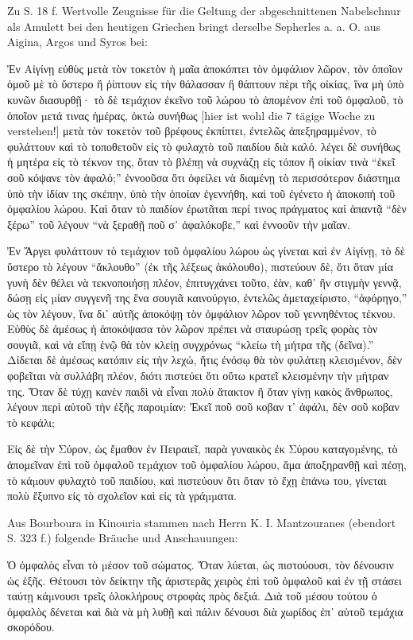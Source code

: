 \documentclass[a4paper, 11pt, oneside]{article}
\begin{document}
Zu S. 18 f. Wertvolle Zeugnisse für die Geltung der abgeschnittenen Nabelschnur als Amulett bei den heutigen Griechen bringt derselbe Sepherles a. a. O. aus Aigina, Argos und Syros bei:

Ἐν Αἰγίνῃ εὐθὺς μετὰ τὸν τοκετὸν ἡ μαῖα ἁποκόπτει τὸν ὀμφάλιον λῶρον, τὸν ὁποῖον ὁμοῦ μὲ τὸ ὕστερο ἢ ῥίπτουν εἰς τὴν θάλασσαν ἢ θάπτουν πὲρι τῆς οἰκίας, ἵνα μὴ ὑπὸ κυνῶν διασυρθῇ· τὸ δὲ τεµάχιον ἐκεῖνο τοῦ λώρου τὸ ἀπομένον ἐπὶ τοῦ ὀμφαλοῦ, τὸ ὁποῖον µετά τινας ἡμέρας, ὀκτὼ συνήθως [hier ist wohl die 7 tägige Woche zu verstehen!] μετὰ τὸν τοκετὸν τοῦ βρέφους ἐκπίπτει, ἐντελῶς ἀπεξηραμμένον, τὸ φυλάττουν καὶ τὸ τοποθετοῦν εἰς τὸ φυλαχτὸ τοῦ παιδίου διὰ καλό. λέγει δὲ συνήθως ἡ μητέρα εἰς τὸ τέκνον της, ὅταν τὸ βλέπῃ νὰ συχνάζῃ εἰς τόπον ἢ οἰκίαν τινὰ "`ἐκεῖ σοῦ κόψανε τὸν ἀφαλό;"' ἐννοοῦσα ὅτι ὀφείλει νὰ διαμένῃ τὸ περισσότερον διάστηµα ὑπὸ τὴν ἰδίαν της σκέπην, ὑπὸ τὴν ὁποίαν ἐγεννήθη, καὶ τοῦ ἐγένετο ἡ ἀποκοπὴ τοῦ ὀμφαλίου λώρου. Καὶ ὅταν τὸ παιδίον ἐρωτᾶται περί τινος πράγματος καὶ ἀπαντᾷ "`δὲν ξέρω"' τοῦ λέγουν "`νὰ ξεραθῇ ποῦ σ᾿ ἀφαλόκοβε,"' καὶ ἐννοοῦν τὴν μαῖαν.

Ἐν Ἄργει φυλάττουν τὸ τεµάχιον τοῦ ὀμφαλίου λώρου ὡς γίνεται καὶ ἐν Αἰγίνῃ, τὸ δὲ ὕστερο τὸ λέγουν "`ἄκλουθο"' (ἐκ τῆς λέξεως ἀκόλουθο), πιστεύουν δὲ, ὅτι ὅταν µία γυνὴ δὲν θέλει νὰ τεκνοποιήσῃ πλέον, ἐπιτυγχάνει τοῦτο, ἐὰν, καθ᾽ ἣν στιγμὴν γεννᾷ, δώσῃ εἰς µίαν συγγενῆ της ἕνα σουγιᾶ καινούργιο, ἐντελῶς ἁμεταχείριστο, "`ἀφόρηγο,"' ὡς τὸν λέγουν, ἵνα δι᾿ αὐτῆς ἀποκόψῃ τὸν ὀμφάλιον λῶρον τοῦ γεννηθέντος τέκνου. Εὐθὺς δὲ ἀμέσως ἡ ἀποκόψασα τὸν λῶρον πρέπει νὰ σταυρώσῃ τρεῖς φορὰς τὸν σουγιᾶ, καὶ νὰ εἴπῃ ἑνῷ θὰ τὸν κλείῃ συγχρόνως "`κλείω τὴ µήτρα τῆς (δεῖνα)."' Δίδεται δὲ ἀμέσως κατόπιν εἰς τὴν λεχώ, ἥτις ἐνόσῳ θὰ τὸν φυλάτεῃ κλεισµένον, δὲν φοβεῖται νὰ συλλάβη πλέον, διότι πιστεύει ὅτι οὕτω κρατεῖ κλεισμένην τὴν µήτραν της. Ὅταν δὲ τύχῃ κανὲν παιδὶ νὰ εἶναι πολὺ ἄτακτον ἢ ὅταν γίνῃ κακὸς ἄνθρωπος, λέγουν περὶ αὐτοῦ τὴν ἑξῆς παροιµίαν: Ἐκεῖ ποῦ σοῦ κοβαν τ᾽ ἀφάλι, δὲν σοῦ κοβαν τὸ κεφάλι;

Εἰς δὲ τὴν Σύρον, ὡς ἔμαθον ἐν Πειραιεῖ, παρὰ γυναικὸς ἐκ Σύρου καταγοµένης, τὸ ἀπομεῖναν ἐπὶ τοῦ ὀμφαλοῦ τεµάχιον τοῦ ὀμφαλίου λώρου, ἅμα ἀποξηρανθῇ καὶ πἐσῃ, τὸ κάµουν φυλαχτὸ τοῦ παιδίου, καὶ πιστεύουν ὅτι ὅταν τὸ ἔχῃ ἐπάνω του, γίνεται πολὺ ἔξυπνο εἰς τὸ σχολεῖον καὶ εἰς τὰ γράµµατα.

Aus Bourboura in Kinouria stammen nach Herrn K. I. Mantzouranes (ebendort S. 323 f.) folgende Bräuche und Anschauungen:

Ὁ ὀμφαλὸς εἶναι τὸ µέσον τοῦ σώματος. Ὅταν λύεται, ὡς πιστούουσι, τὸν δένουσιν ὡς ἑξῆς. Θέτουσι τὸν δείκτην τῆς ἀριστερᾶς χειρὸς ἐπὶ τοῦ ὀμφαλοῦ καὶ ἐν τῇ στάσει ταύτῃ κάµνουσι τρεῖς ὁλοκλήρους στροφὰς πρὸς δεξιά. Διὰ τοῦ µέσου τούτου ὁ ὀμφαλὸς δένεται καὶ διὰ νὰ μὴ λυθῇ καὶ πάλιν δένουσι διὰ χωρίδος ἐπ᾽ αὐτοῦ τεμάχια σκορόδου.
\end{document}
